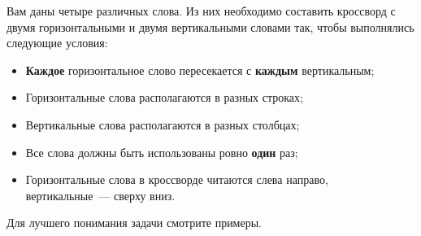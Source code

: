 Вам даны четыре различных слова. Из них необходимо составить кроссворд с двумя горизонтальными и двумя вертикальными словами так, чтобы выполнялись следующие условия:

\begin{itemize}
\item \textbf{Каждое} горизонтальное слово пересекается с \textbf{каждым} вертикальным;
\item Горизонтальные слова располагаются в разных строках;
\item Вертикальные слова располагаются в разных столбцах;
\item Все слова должны быть использованы ровно \textbf{один} раз;
\item Горизонтальные слова в кроссворде читаются слева направо, вертикальные~--- сверху вниз.
\end{itemize}

Для лучшего понимания задачи смотрите примеры.